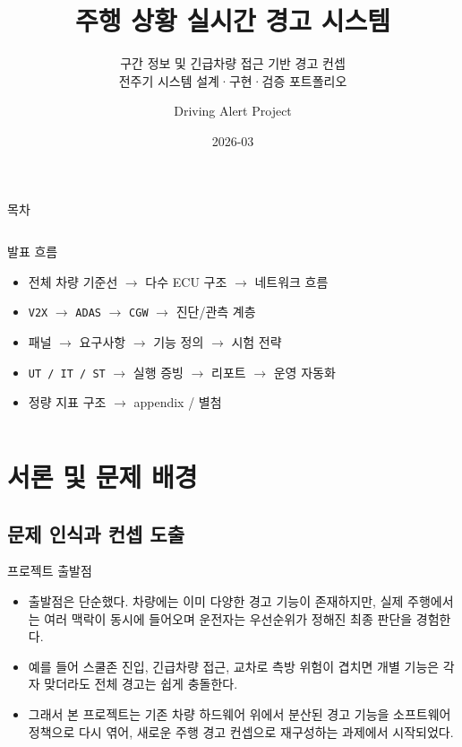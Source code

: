 \documentclass[aspectratio=169,10pt]{beamer}
\title{주행 상황 실시간 경고 시스템}
\subtitle{구간 정보 및 긴급차량 접근 기반 경고 컨셉\\전주기 시스템 설계·구현·검증 포트폴리오}
\author{Driving Alert Project}
\date{2026-03}
\begin{document}
\begin{frame}
  \titlepage
\end{frame}

\begin{frame}{목차}
\begin{columns}[T,onlytextwidth]
\footnotesize
\tableofcontents

\small
\begin{block}{발표 흐름}
\scriptsize
\begin{itemize}
  \item 전체 차량 기준선 $\rightarrow$ 다수 ECU 구조 $\rightarrow$ 네트워크 흐름
  \item \texttt{V2X} $\rightarrow$ \texttt{ADAS} $\rightarrow$ \texttt{CGW} $\rightarrow$ 진단/관측 계층
  \item 패널 $\rightarrow$ 요구사항 $\rightarrow$ 기능 정의 $\rightarrow$ 시험 전략
  \item \texttt{UT / IT / ST} $\rightarrow$ 실행 증빙 $\rightarrow$ 리포트 $\rightarrow$ 운영 자동화
  \item 정량 지표 구조 $\rightarrow$ appendix / 별첨
\end{itemize}
\end{block}
\end{columns}
\end{frame}


\section{서론 및 문제 배경}
\subsection{문제 인식과 컨셉 도출}

\begin{frame}{프로젝트 출발점}
\begin{itemize}
  \item 출발점은 단순했다. 차량에는 이미 다양한 경고 기능이 존재하지만, 실제 주행에서는 여러 맥락이 동시에 들어오며 운전자는 우선순위가 정해진 최종 판단을 경험한다.
  \item 예를 들어 스쿨존 진입, 긴급차량 접근, 교차로 측방 위험이 겹치면 개별 기능은 각자 맞더라도 전체 경고는 쉽게 충돌한다.
  \item 그래서 본 프로젝트는 기존 차량 하드웨어 위에서 분산된 경고 기능을 소프트웨어 정책으로 다시 엮어, 새로운 주행 경고 컨셉으로 재구성하는 과제에서 시작되었다.
\end{itemize}
\end{frame}
\end{document}
